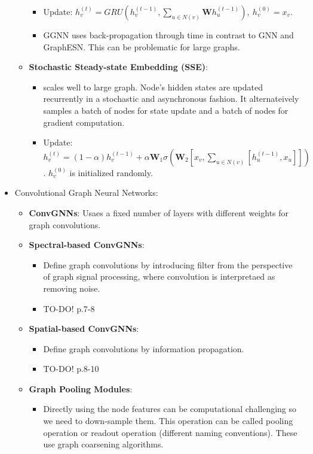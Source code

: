\begin{itemize}[noitemsep,nolistsep]
\begin{itemize}[noitemsep,nolistsep]
\begin{itemize}[noitemsep,nolistsep]
			\item Update: $h_v^{(t)} = GRU(h_v^{(t-1)}, \sum_{u \in N(v)} \mathbf{W} h_u^{(t-1)} ),\  h_v^{(0)} = x_v$.
			\item GGNN uses back-propagation through time in contrast to GNN and GraphESN. This can be problematic for large graphs.
		\end{itemize}
		\item \textbf{Stochastic Steady-state Embedding (SSE)}:
		\begin{itemize}[noitemsep,nolistsep]
			\item scales well to large graph. Node's hidden states are updated recurrently in a stochastic and asynchronous fashion. It alternateively samples a batch of nodes for state update and a batch of nodes for gradient computation.
			\item Update: $h_v^{(t)} = (1 - \alpha)h_v^{(t-1)} + \alpha \mathbf{W}_1 \sigma(\mathbf{W}_2 [x_v, \sum_{u \in N(v)} [h_u^{(t-1)}, x_u]])$. $h_v^{(0)}$ is initialized randomly.
		\end{itemize}
	\end{itemize}
	\item Convolutional Graph Neural Networks:
	\begin{itemize}[noitemsep,nolistsep]
		\item \textbf{ConvGNNs}: Usaes a fixed number of layers with different weights for graph convolutions.
		\item \textbf{Spectral-based ConvGNNs}: 
		\begin{itemize}[noitemsep,nolistsep]
			\item Define graph convolutions by introducing filter from the perspective of graph signal processing, where convolution is interpretaed as removing noise.
			\item TO-DO! p.7-8
		\end{itemize}
		\item \textbf{Spatial-based ConvGNNs}: 
		\begin{itemize}[noitemsep,nolistsep]
			\item Define graph convolutions by information propagation.
			\item TO-DO! p.8-10
		\end{itemize}	
		\item \textbf{Graph Pooling Modules}:
		\begin{itemize}[noitemsep,nolistsep]
			\item Directly using the node features can be computational challenging so we need to down-sample them. This operation can be called pooling operation or readout operation (different naming conventions). These use graph coarsening algorithms.

\end{itemize}
\end{itemize}
\end{itemize}
